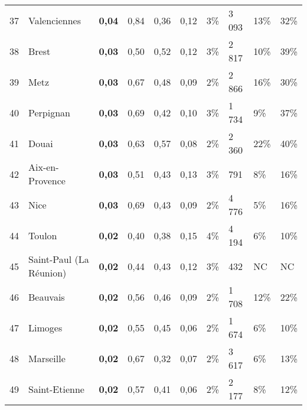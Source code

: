 \begin{longtable}{p{0.5cm}p{4cm}p{0.5cm}p{0.5cm}p{0.5cm}p{0.5cm}p{1cm}p{1cm}p{1cm}p{1cm}}
    \small{37} & \small{Valenciennes} & \small{\textbf{0,04}} & \small{0,84} & \small{0,36} & \small{0,12} & \small{3\%} & \small{3 093} & \small{13\%} & \small{32\%}\\
    \small{38} & \small{Brest} & \small{\textbf{0,03}} & \small{0,50} & \small{0,52} & \small{0,12} & \small{3\%} & \small{2 817} & \small{10\%} & \small{39\%}\\
    \small{39} & \small{Metz} & \small{\textbf{0,03}} & \small{0,67} & \small{0,48} & \small{0,09} & \small{2\%} & \small{2 866} & \small{16\%} & \small{30\%}\\
    \small{40} & \small{Perpignan} & \small{\textbf{0,03}} & \small{0,69} & \small{0,42} & \small{0,10} & \small{3\%} & \small{1 734} & \small{9\%} & \small{37\%}\\
    \small{41} & \small{Douai} & \small{\textbf{0,03}} & \small{0,63} & \small{0,57} & \small{0,08} & \small{2\%} & \small{2 360} & \small{22\%} & \small{40\%}\\
    \small{42} & \small{Aix-en-Provence} & \small{\textbf{0,03}} & \small{0,51} & \small{0,43} & \small{0,13} & \small{3\%} & \small{791} & \small{8\%} & \small{16\%}\\
    \small{43} & \small{Nice} & \small{\textbf{0,03}} & \small{0,69} & \small{0,43} & \small{0,09} & \small{2\%} & \small{4 776} & \small{5\%} & \small{16\%}\\
    \small{44} & \small{Toulon} & \small{\textbf{0,02}} & \small{0,40} & \small{0,38} & \small{0,15} & \small{4\%} & \small{4 194} & \small{6\%} & \small{10\%}\\
    \small{45} & \small{Saint-Paul (La Réunion)} & \small{\textbf{0,02}} & \small{0,44} & \small{0,43} & \small{0,12} & \small{3\%} & \small{432} & \small{NC} & \small{NC}\\
    \small{46} & \small{Beauvais} & \small{\textbf{0,02}} & \small{0,56} & \small{0,46} & \small{0,09} & \small{2\%} & \small{1 708} & \small{12\%} & \small{22\%}\\
    \small{47} & \small{Limoges} & \small{\textbf{0,02}} & \small{0,55} & \small{0,45} & \small{0,06} & \small{2\%} & \small{1 674} & \small{6\%} & \small{10\%}\\
    \small{48} & \small{Marseille} & \small{\textbf{0,02}} & \small{0,67} & \small{0,32} & \small{0,07} & \small{2\%} & \small{3 617} & \small{6\%} & \small{13\%}\\
    \small{49} & \small{Saint-Etienne} & \small{\textbf{0,02}} & \small{0,57} & \small{0,41} & \small{0,06} & \small{2\%} & \small{2 177} & \small{8\%} & \small{12\%}\\

\end{longtable}
